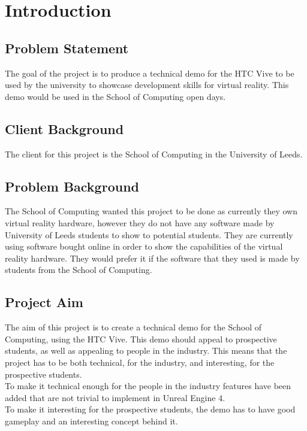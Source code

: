 \chapter{Introduction}
\label{chapter1}

\section{Problem Statement}
The goal of the project is to produce a technical demo for the HTC Vive to be used by the university to showcase development skills for virtual reality. This demo would be used in the School of Computing open days.

\section{Client Background}
The client for this project is the School of Computing in the University of Leeds.

\section{Problem Background}
The School of Computing wanted this project to be done as currently they own virtual reality hardware, however they do not have any software made by University of Leeds students to show to potential students. They are currently using software bought online in order to show the capabilities of the virtual reality hardware. They would prefer it if the software that they used is made by students from the School of Computing.


\section{Project Aim}
The aim of this project is to create a technical demo for the School of Computing, using the HTC Vive. This demo should appeal to prospective students, as well as appealing to people in the industry. This means that the project has to be both technical, for the industry, and interesting, for the prospective students.\\
To make it technical enough for the people in the industry features have been added that are not trivial to implement in Unreal Engine 4.\\
To make it interesting for the prospective students, the demo has to have good gameplay and an interesting concept behind it.\\


